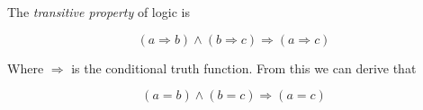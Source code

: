 \documentclass[12pt]{article}
\begin{document}
The \emph{transitive property} of logic is 

$$ (a \Rightarrow b) \land (b \Rightarrow c) \Rightarrow (a \Rightarrow c) $$

Where $\Rightarrow$ is the conditional truth function.  From this we can derive that

$$ (a = b) \land (b = c) \Rightarrow (a = c) $$
\end{document}
